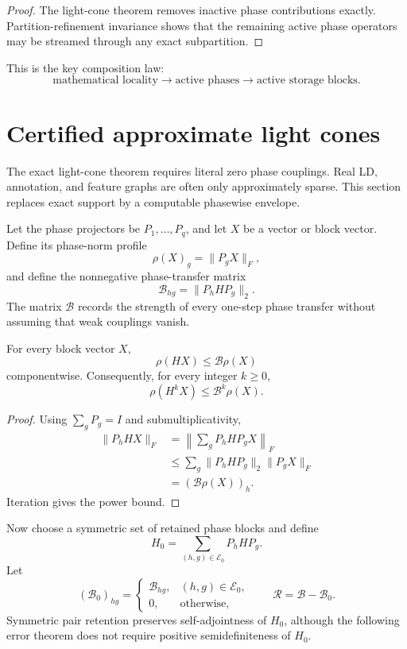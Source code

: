 \begin{proof}
The light-cone theorem removes inactive phase contributions exactly.
Partition-refinement invariance shows that the remaining active phase
operators may be streamed through any exact subpartition.
\end{proof}

This is the key composition law:
\[
\boxed{
\text{mathematical locality}
\longrightarrow
\text{active phases}
\longrightarrow
\text{active storage blocks}.
}
\]


\section{Certified approximate light cones}\label{sec:final-15}
\label{sec:approx-lightcone}

The exact light-cone theorem requires literal zero phase couplings.  Real LD,
annotation, and feature graphs are often only approximately sparse.  This
section replaces exact support by a computable phasewise envelope.

Let the phase projectors be $P_1,\ldots,P_q$, and let $X$ be a vector or block
vector.  Define its phase-norm profile
\[
\rho(X)_g=\lVert P_gX\rVert_F,
\]
and define the nonnegative phase-transfer matrix
\[
\mathcal B_{hg}=\lVert P_hHP_g\rVert_2.
\]
The matrix $\mathcal B$ records the strength of every one-step phase transfer
without assuming that weak couplings vanish.

\begin{theorem}
\label{thm:weighted-transfer}
For every block vector $X$,
\[
\boxed{
\rho(HX)\leq \mathcal B\rho(X)
}
\]
componentwise.  Consequently, for every integer $k\geq0$,
\[
\boxed{
\rho(H^kX)\leq \mathcal B^k\rho(X).
}
\]
\end{theorem}

\begin{proof}
Using $\sum_gP_g=I$ and submultiplicativity,
\[
\begin{aligned}
\lVert P_hHX\rVert_F
&=\left\lVert\sum_gP_hHP_gX\right\rVert_F\\
&\leq\sum_g\lVert P_hHP_g\rVert_2\lVert P_gX\rVert_F\\
&=(\mathcal B\rho(X))_h.
\end{aligned}
\]
Iteration gives the power bound.
\end{proof}

Now choose a symmetric set of retained phase blocks and define
\[
H_0=\sum_{(h,g)\in\mathcal E_0}P_hHP_g.
\]
Let
\[
(\mathcal B_0)_{hg}=
\begin{cases}
\mathcal B_{hg},&(h,g)\in\mathcal E_0,\\
0,&\text{otherwise},
\end{cases}
\qquad
\mathcal R=\mathcal B-\mathcal B_0.
\]
Symmetric pair retention preserves self-adjointness of $H_0$, although the
following error theorem does not require positive semidefiniteness of $H_0$.

